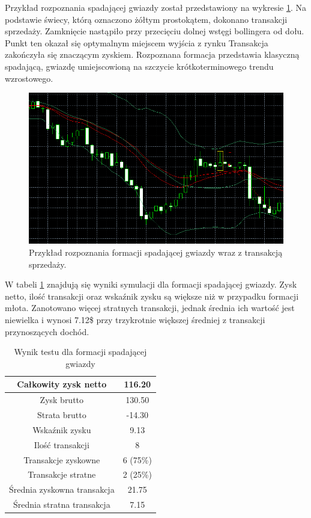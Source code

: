 \documentclass[pdflatex,11pt]{aghdpl}
\begin{document}
Przykład rozpoznania spadającej gwiazdy został przedstawiony na wykresie \ref{przyklad_gwiazda}. Na podstawie świecy, którą oznaczono żółtym prostokątem, dokonano transakcji sprzedaży. Zamknięcie nastąpiło przy przecięciu dolnej wstęgi bollingera od dołu. Punkt ten okazał się optymalnym miejscem wyjścia z rynku Transakcja zakończyła się znaczącym zyskiem. Rozpoznana formacja przedstawia klasyczną spadającą, gwiazdę umiejscowioną na szczycie krótkoterminowego trendu wzrostowego.
\begin{figure}[h!]
\begin{center}
\includegraphics[width=14cm]{shootingstar/przyklad.png}
\caption{Przykład rozpoznania formacji spadającej gwiazdy wraz z transakcją sprzedaży.}
\label{przyklad_gwiazda}
\end{center}
\end{figure} 
W tabeli \ref{raport_gwiazda} znajdują się wyniki symulacji dla formacji spadającej gwiazdy. Zysk netto, ilość transakcji oraz wskaźnik zysku są większe niż w przypadku formacji młota. Zanotowano więcej stratnych transakcji, jednak średnia ich wartość jest niewielka i wynosi 7.12\$ przy trzykrotnie większej średniej z transakcji przynoszących dochód.  
\begin{table}[h!]
\begin{center}
\begin{tabular}{|c|c|}
\hline 
Całkowity zysk netto & 116.20\\
\hline
Zysk brutto & 130.50 \\
\hline
Strata brutto & -14.30 \\
\hline
Wskaźnik zysku & 9.13 \\
\hline
\hline
Ilość transakcji & 8 \\
\hline
Transakcje zyskowne & 6 (75\%) \\
\hline
Transakcje stratne & 2 (25\%) \\
\hline
\hline
Średnia zyskowna transakcja & 21.75 \\
\hline
Średnia stratna transakcja & 7.15 \\
\hline
\end{tabular} 
\caption{Wynik testu dla formacji spadającej gwiazdy}
\label{raport_gwiazda}
\end{center}
\end{table}
\end{document}

